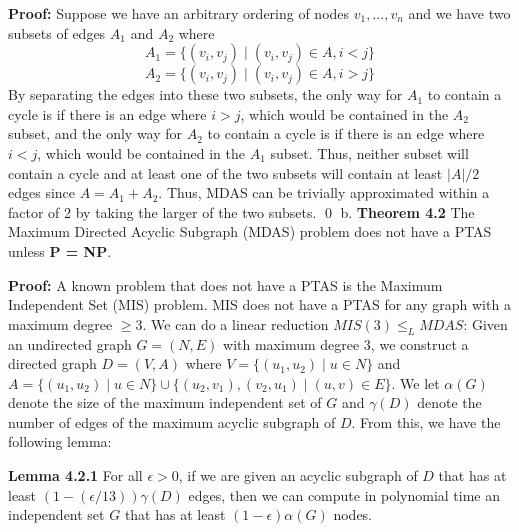 \documentclass[oneside]{homework} %
\begin{document}
\textbf{Proof:} Suppose we have an arbitrary ordering of nodes $v_1, ..., v_n$ and we have two subsets of edges $A_1$ and $A_2$ where $$A_1 = \{(v_i, v_j) \mid (v_i, v_j) \in A, i < j\}$$ $$A_2 = \{(v_i, v_j) \mid (v_i, v_j) \in A, i > j\}$$ By separating the edges into these two subsets, the only way for $A_1$ to contain a cycle is if there is an edge where $i > j$, which would be contained in the $A_2$ subset, and the only way for $A_2$ to contain a cycle is if there is an edge where $ i < j$, which would be contained in the $A_1$ subset. Thus, neither subset will contain a cycle and at least one of the two subsets will contain at least $|A|/2$ edges since $A = A_1 + A_2$. Thus, MDAS can be trivially approximated within a factor of 2 by taking the larger of the two subsets. \hfill\qed
\newline
\newline
{\large b.} \textbf{Theorem 4.2} The Maximum Directed Acyclic Subgraph (MDAS) problem does not have a PTAS unless \textbf{P = NP}.
\newline

\textbf{Proof:} A known problem that does not have a PTAS is the Maximum Independent Set (MIS) problem. MIS does not have a PTAS for any graph with a maximum degree $\geq 3$. We can do a linear reduction $MIS(3) \leq_L MDAS$: Given an undirected graph $G = (N, E)$ with maximum degree 3, we construct a directed graph $D = (V, A)$ where $V = \{(u_1, u_2) \mid u \in N\}$ and $A = \{(u_1, u_2) \mid u \in N\}  \cup \{(u_2, v_1),(v_2, u_1) \mid (u, v) \in E\}$. We let $\alpha(G)$ denote the size of the maximum independent set of $G$ and $\gamma(D)$ denote the number of edges of the maximum acyclic subgraph of $D$. From this, we have the following lemma:
\newline

\textbf{Lemma 4.2.1} For all $\epsilon > 0$, if we are given an acyclic subgraph of $D$ that has at least $(1-(\epsilon/13))\gamma(D)$ edges, then we can compute in polynomial time an independent set $G$ that has at least $(1-\epsilon)\alpha(G)$ nodes.
\newline
\end{document}
